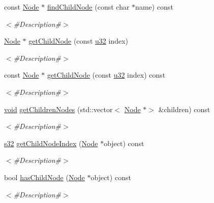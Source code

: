 \begin{DoxyCompactItemize}
const \mbox{\hyperlink{classnjli_1_1_node}{Node}} $\ast$ \mbox{\hyperlink{classnjli_1_1_node_adee1d24767f0aae877ee2275b8406e99}{find\+Child\+Node}} (const char $\ast$name) const
\begin{DoxyCompactList}\small\item\em $<$\#\+Description\#$>$ \end{DoxyCompactList}\item 
\mbox{\hyperlink{classnjli_1_1_node}{Node}} $\ast$ \mbox{\hyperlink{classnjli_1_1_node_a2c324ab68a85fda11dd1c9e324de9f5d}{get\+Child\+Node}} (const \mbox{\hyperlink{_util_8h_a10e94b422ef0c20dcdec20d31a1f5049}{u32}} index)
\begin{DoxyCompactList}\small\item\em $<$\#\+Description\#$>$ \end{DoxyCompactList}\item 
const \mbox{\hyperlink{classnjli_1_1_node}{Node}} $\ast$ \mbox{\hyperlink{classnjli_1_1_node_afb42f32385d6413ffca69072bf3381a9}{get\+Child\+Node}} (const \mbox{\hyperlink{_util_8h_a10e94b422ef0c20dcdec20d31a1f5049}{u32}} index) const
\begin{DoxyCompactList}\small\item\em $<$\#\+Description\#$>$ \end{DoxyCompactList}\item 
\mbox{\hyperlink{_thread_8h_af1e856da2e658414cb2456cb6f7ebc66}{void}} \mbox{\hyperlink{classnjli_1_1_node_a941c51cab768f4f3faf80bcb590602e2}{get\+Children\+Nodes}} (std\+::vector$<$ \mbox{\hyperlink{classnjli_1_1_node}{Node}} $\ast$$>$ \&children) const
\begin{DoxyCompactList}\small\item\em $<$\#\+Description\#$>$ \end{DoxyCompactList}\item 
\mbox{\hyperlink{_util_8h_aa62c75d314a0d1f37f79c4b73b2292e2}{s32}} \mbox{\hyperlink{classnjli_1_1_node_a6c77a7d8e6c4bc04c990d9d8db12cf4d}{get\+Child\+Node\+Index}} (\mbox{\hyperlink{classnjli_1_1_node}{Node}} $\ast$object) const
\begin{DoxyCompactList}\small\item\em $<$\#\+Description\#$>$ \end{DoxyCompactList}\item 
bool \mbox{\hyperlink{classnjli_1_1_node_ad6294680a8854dce1a887abd2b692b1d}{has\+Child\+Node}} (\mbox{\hyperlink{classnjli_1_1_node}{Node}} $\ast$object) const
\begin{DoxyCompactList}\small\item\em $<$\#\+Description\#$>$ \end{DoxyCompactList}\item 
$$
\end{DoxyCompactItemize}
